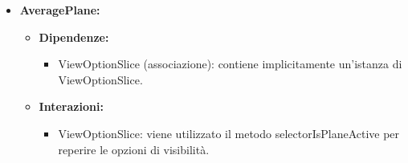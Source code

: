 \begin{itemize}
      \item \textbf{AveragePlane:}
            \begin{itemize}
                  \item \textbf{Dipendenze:}
                        \begin{itemize}
                              \item ViewOptionSlice (associazione): contiene implicitamente un'istanza di
                                    ViewOptionSlice.
                        \end{itemize}
                  \item \textbf{Interazioni:}
                        \begin{itemize}
                              \item ViewOptionSlice: viene utilizzato il metodo selectorIsPlaneActive per reperire
                                    le opzioni di visibilità.
                        \end{itemize}
            \end{itemize}

\end{itemize}

